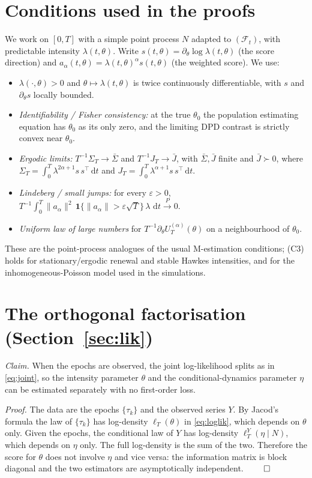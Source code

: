 \documentclass[11pt]{article}
\newcommand{\dd}{\,\mathrm{d}}
\newcommand{\F}{\mathcal{F}}
\newcommand{\toP}{\xrightarrow{P}}
\begin{document}
\section{Conditions used in the proofs}
\label{app:cond}
We work on $[0,T]$ with a simple point process $N$ adapted to $(\F_t)$, with
predictable intensity $\lambda(t,\theta)$. Write
$s(t,\theta)=\partial_\theta\log\lambda(t,\theta)$ (the score direction) and
$a_\alpha(t,\theta)=\lambda(t,\theta)^{\alpha}s(t,\theta)$ (the weighted score).
We use:
\begin{itemize}
\item[(C1)] $\lambda(\cdot,\theta)>0$ and $\theta\mapsto\lambda(t,\theta)$ is twice
continuously differentiable, with $s$ and $\partial_\theta s$ locally bounded.
\item[(C2)] \emph{Identifiability / Fisher consistency:} at the true $\theta_0$ the
population estimating equation has $\theta_0$ as its only zero, and the limiting
DPD contrast is strictly convex near $\theta_0$.
\item[(C3)] \emph{Ergodic limits:} $T^{-1}\Sigma_T\to\bar\Sigma$ and
$T^{-1}J_T\to\bar J$, with $\bar\Sigma,\bar J$ finite and $\bar J\succ0$, where
$\Sigma_T=\int_0^T \lambda^{2\alpha+1}s\,s^{\top}\dd t$ and
$J_T=\int_0^T \lambda^{\alpha+1}s\,s^{\top}\dd t$.
\item[(C4)] \emph{Lindeberg / small jumps:} for every $\varepsilon>0$,
$T^{-1}\int_0^T \|a_\alpha\|^2\,\mathbf 1\{\|a_\alpha\|>\varepsilon\sqrt T\}\,\lambda\,\dd t\toP0$.
\item[(C5)] \emph{Uniform law of large numbers} for $T^{-1}\partial_\theta U_T^{(\alpha)}(\theta)$
on a neighbourhood of $\theta_0$.
\end{itemize}
These are the point-process analogues of the usual M-estimation conditions; (C3)
holds for stationary/ergodic renewal and stable Hawkes intensities, and for the
inhomogeneous-Poisson model used in the simulations.

\section{The orthogonal factorisation (Section~\ref{sec:lik})}
\label{app:fact}
\emph{Claim.} When the epochs are observed, the joint log-likelihood splits as in
\eqref{eq:joint}, so the intensity parameter $\theta$ and the conditional-dynamics
parameter $\eta$ can be estimated separately with no first-order loss.

\emph{Proof.} The data are the epochs $\{\tau_k\}$ and the observed series
$Y$. By Jacod's formula the law of $\{\tau_k\}$ has log-density $\ell_T(\theta)$ in
\eqref{eq:loglik}, which depends on $\theta$ only. Given the epochs, the
conditional law of $Y$ has log-density $\ell_T^Y(\eta\mid N)$, which depends on
$\eta$ only. The full log-density is the sum of the two. Therefore the score for
$\theta$ does not involve $\eta$ and vice versa: the information matrix is block
diagonal and the two estimators are asymptotically independent. $\qed$
\end{document}
